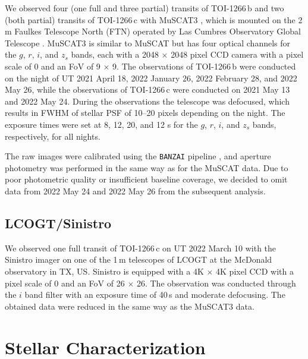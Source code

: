 \documentclass[twocolumn]{aastex631}
\begin{document}
We observed four (one full and three partial) transits of TOI-1266\,b and two (both partial) transits of TOI-1266\,c with MuSCAT3 \citep{2020SPIE11447E..5KN}, which is mounted on the 2\,m Faulkes Telescope North (FTN) operated by Las Cumbres Observatory Global Telescope \citep[LCOGT,][]{Brown2013}. MuSCAT3 is similar to MuSCAT but has four optical channels for the $g$, $r$, $i$, and $z_s$ bands, each with a 2048 $\times$ 2048 pixel CCD camera with a pixel scale of 0 and an FoV of 9 $\times$ 9. The observations of TOI-1266\,b were conducted on the night of UT 2021 April 18, 2022 January 26, 2022 February 28, and 2022 May 26, while the observations of TOI-1266\,c were conducted on 2021 May 13 and 2022 May 24. During the observations the telescope was defocused, which results in FWHM of stellar PSF of 10--20 pixels depending on the night. The exposure times were set at 8, 12, 20, and 12 s for the $g$, $r$, $i$, and $z_s$ bands, respectively, for all nights.

The raw images were calibrated using the {\tt BANZAI} pipeline \citep{McCully:2018}, and aperture photometry was performed in the same way as for the MuSCAT data. Due to poor photometric quality or insufficient baseline coverage, we decided to omit data from 2022 May 24 and 2022 May 26 from the subsequent analysis.

\subsection{LCOGT/Sinistro}

We observed one full transit of TOI-1266\,c on UT 2022 March 10 with the Sinistro imager on one of the 1\,m telescopes of LCOGT at the McDonald observatory in TX, US. Sinistro is equipped with a 4K $\times$ 4K pixel CCD with a pixel scale of 0 and an FoV of 26 $\times$ 26. The observation was conducted through the $i$ band filter with an exposure time of 40\,s and moderate defocusing. The obtained data were reduced in the same way as the MuSCAT3 data.

\section{Stellar Characterization} \label{sec:Stellar Characterization}
\end{document}
